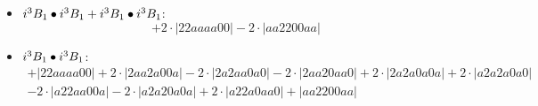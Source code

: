 \documentclass{article}
\begin{document}
\begin{itemize}
$$\begin{array}{c}
\end{array}$$
\item \boldmath$i^3 B_{1} \bullet i^3 B_{1} + i^3 B_{1} \bullet i^3 B_{1} \displaystyle $\unboldmath : \quad$$+2 \cdot \left|22aaaa00\right| -2 \cdot \left|aa2200aa\right|$$
\item \boldmath$i^3 B_{1} \bullet i^3 B_{1} \displaystyle $\unboldmath : \quad$$\begin{array}{c}
+\left|22aaaa00\right| +2 \cdot \left|2aa2a00a\right| -2 \cdot \left|2a2aa0a0\right| -2 \cdot \left|2aa20aa0\right| +2 \cdot \left|2a2a0a0a\right| +2 \cdot \left|a2a2a0a0\right| \\[0.5cm] -2 \cdot \left|a22aa00a\right| -2 \cdot \left|a2a20a0a\right| +2 \cdot \left|a22a0aa0\right| +\left|aa2200aa\right|
\end{array}$$

\end{itemize}
\end{document}
